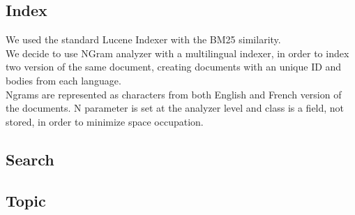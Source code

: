 \subsection{Index}
We used the standard Lucene Indexer with the BM25\cite{BM25} similarity.\\
We decide to use NGram analyzer with a multilingual indexer,
in order to index two version of the same document, creating documents with
an unique ID and bodies from each language.\\
Ngrams are represented as characters from both English and French version of
the documents. N parameter is set at the analyzer level and class is a field,
not stored, in order to minimize space occupation.\\

\subsection{Search}

\subsection{Topic}